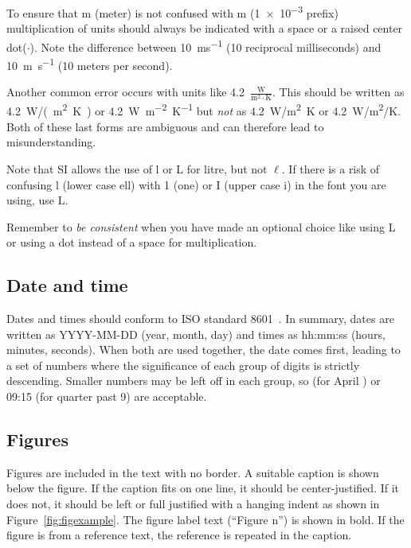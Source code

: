 \documentclass[a5paper, 10pt]{article}
\begin{document}
To ensure that m (meter) is not confused with m (\num{1e-3} prefix) multiplication of units should always be indicated with a space or a raised center dot($\cdot$).
Note the difference between \SI{10}{ms^{-1}} (10 reciprocal milliseconds) and \SI{10}{m.s^{-1}} (10 meters per second).

Another common error occurs with units like 
\num{4.2}~$\frac{\mathrm{W}}{\mathrm{m}^2\cdot\mathrm{K}}$.  
This should be written as \SI{4.2}{W/(m^2.K)} or
\SI{4.2}{W.m^{-2}.K^{-1}} 
but \emph{not} as \SI{4.2}{W/m^2K} or \SI{4.2}{W/m^2/K}.  
Both of these last forms are ambiguous and can therefore lead to misunderstanding.

Note that SI allows the use of l or L for litre, but not $\ell$.
If there is a risk of confusing l (lower case ell) with 1 (one) or I (upper case i) in the font you are using, use L.

Remember to \emph{be consistent} when you have made an optional choice like using L or using a dot instead of a space for multiplication.

\subsection{Date and time}
Dates and times should conform to ISO standard 8601~\citep{isodates}.
In summary, dates are written as YYYY-MM-DD (year, month, day) and times as hh:mm:ss (hours, minutes, seconds).  
When both are used together, the date comes first, leading to a set of numbers where the significance of each group of digits is strictly descending.
Smaller numbers may be left off in each group, so \the{} (for April \the\year) or 09:15 (for quarter past 9) are acceptable.

\subsection{Figures}
Figures are included in the text with no border. 
A suitable caption is shown below the figure.
If the caption fits on one line, it should be center-justified.
If it does not, it should be left or full justified with a hanging indent as shown in Figure~\ref{fig:figexample}.
The figure label text (``Figure n'') is shown in bold.
If the figure is from a reference text, the reference is repeated in the caption.
\end{document}
